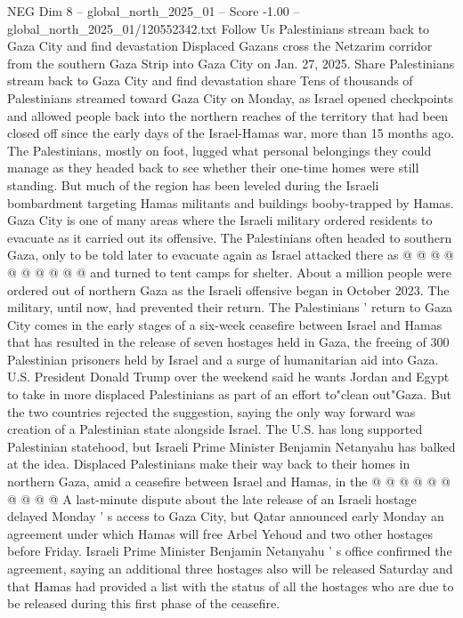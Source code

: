 \begin{textsample}{NEG Dim 8 – global\_north\_2025\_01 – Score -1.00 – global\_north\_2025\_01/120552342.txt}  \label{ex:f8_neg_167}
Follow Us Palestinians stream back to Gaza City and find devastation Displaced Gazans cross the Netzarim corridor from the southern Gaza Strip into Gaza City on Jan. 27, 2025.
Share Palestinians stream back to Gaza City and find devastation share Tens of thousands of Palestinians streamed toward Gaza City on Monday, as Israel opened checkpoints and allowed people back into the northern reaches of the territory that had been closed off since the early days of the Israel-Hamas war, more than 15 months ago.
The Palestinians, mostly on foot, lugged what personal belongings they could manage as they headed back to see whether their one-time homes were still standing.
But much of the region has been leveled during the Israeli bombardment targeting Hamas militants and buildings booby-trapped by Hamas.
Gaza City is one of many areas where the Israeli military ordered residents to evacuate as it carried out its offensive.
The Palestinians often headed to southern Gaza, only to be told later to evacuate again as Israel attacked there as @ @ @ @ @ @ @ @ @ @ and turned to tent camps for shelter.
About a million people were ordered out of northern Gaza as the Israeli offensive began in October 2023.
The military, until now, had prevented their return.
The Palestinians ' return to Gaza City comes in the early stages of a six-week ceasefire between Israel and Hamas that has resulted in the release of seven hostages held in Gaza, the freeing of 300 Palestinian prisoners held by Israel and a surge of humanitarian aid into Gaza.
U.S.
President Donald Trump over the weekend said he wants Jordan and Egypt to take in more displaced Palestinians as part of an effort to"clean out"Gaza.
But the two countries rejected the suggestion, saying the only way forward was creation of a Palestinian state alongside Israel.
The U.S. has long supported Palestinian statehood, but Israeli Prime Minister Benjamin Netanyahu has balked at the idea.
Displaced Palestinians make their way back to their homes in northern Gaza, amid a ceasefire between Israel and Hamas, in the @ @ @ @ @ @ @ @ @ @ A last-minute dispute about the late release of an Israeli hostage delayed Monday ' s access to Gaza City, but Qatar announced early Monday an agreement under which Hamas will free Arbel Yehoud and two other hostages before Friday.
Israeli Prime Minister Benjamin Netanyahu ' s office confirmed the agreement, saying an additional three hostages also will be released Saturday and that Hamas had provided a list with the status of all the hostages who are due to be released during this first phase of the ceasefire.

\end{textsample}
